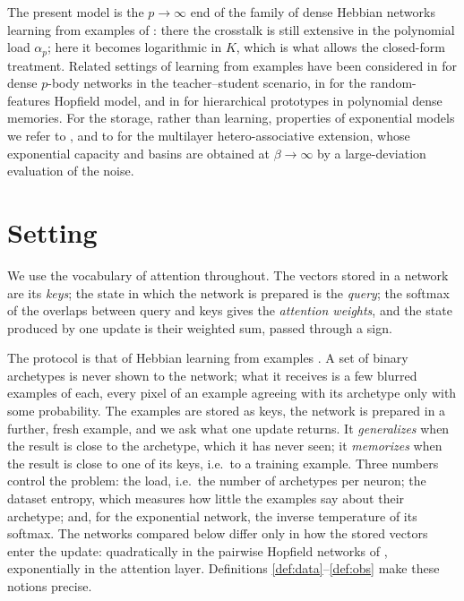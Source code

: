 \documentclass[11pt,a4paper]{article}
\begin{document}
The present model is the $p\to\infty$ end of the family of dense Hebbian networks learning from examples of \cite{Agliari2023sup,Agliari2023unsup}: there the crosstalk is still extensive in the polynomial load $\alpha_p$; here it becomes logarithmic in $K$, which is what allows the closed-form treatment. Related settings of learning from examples have been considered in \cite{Theriault2024} for dense $p$-body networks in the teacher--student scenario, in \cite{Negri2023} for the random-features Hopfield model, and in \cite{Cowsik2026} for hierarchical prototypes in polynomial dense memories. For the storage, rather than learning, properties of exponential models we refer to \cite{Demircigil2017,Lucibello2024,Albanese2025exp}, and to \cite{Agliari2026hetero} for the multilayer hetero-associative extension, whose exponential capacity and basins are obtained at $\beta\to\infty$ by a large-deviation evaluation of the noise.

\section{Setting}\label{sec:setting}

We use the vocabulary of attention throughout. The vectors stored in a network are its \emph{keys}; the state in which the network is prepared is the \emph{query}; the softmax of the overlaps between query and keys gives the \emph{attention weights}, and the state produced by one update is their weighted sum, passed through a sign.

The protocol is that of Hebbian learning from examples \cite{Agliari2022concept,Alemanno2023}. A set of binary archetypes is never shown to the network; what it receives is a few blurred examples of each, every pixel of an example agreeing with its archetype only with some probability. The examples are stored as keys, the network is prepared in a further, fresh example, and we ask what one update returns. It \emph{generalizes} when the result is close to the archetype, which it has never seen; it \emph{memorizes} when the result is close to one of its keys, i.e.\ to a training example. Three numbers control the problem: the load, i.e.\ the number of archetypes per neuron; the dataset entropy, which measures how little the examples say about their archetype; and, for the exponential network, the inverse temperature of its softmax. The networks compared below differ only in how the stored vectors enter the update: quadratically in the pairwise Hopfield networks of \cite{Agliari2022concept,Alemanno2023}, exponentially in the attention layer. Definitions \ref{def:data}--\ref{def:obs} make these notions precise.
\end{document}
